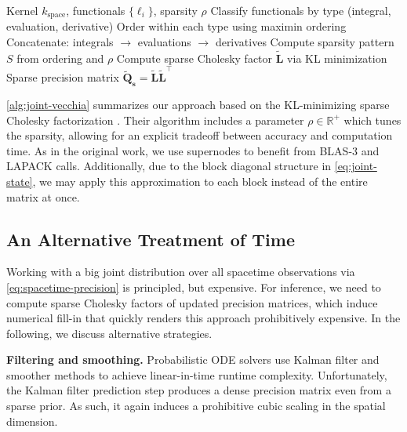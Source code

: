 \documentclass{article}
\theoremstyle{plain}
\theoremstyle{definition}
\theoremstyle{remark}
\newcommand{\R}{\mathbb{R}}
\begin{document}
\begin{algorithm}[tb]
  \caption{Joint Spatial Vecchia Approximation}
  \begin{algorithmic}
     Kernel $k_{\text{space}}$, functionals $\{\ell_i\}$, sparsity $\rho$
    \STATE Classify functionals by type (integral, evaluation, derivative)
    \STATE Order within each type using maximin ordering
    \STATE Concatenate: integrals $\rightarrow$ evaluations $\rightarrow$ derivatives
    \STATE Compute sparsity pattern $S$ from ordering and $\rho$
    \STATE Compute sparse Cholesky factor $\bm{\tilde{L}}$ via KL minimization
     Sparse precision matrix $\bm{\tilde{Q}_s} = \bm{\tilde{L}} \bm{\tilde{L}}^\top$
  \end{algorithmic}
  \label{alg:joint-vecchia}
\end{algorithm}

\cref{alg:joint-vecchia} summarizes our approach based on the KL-minimizing sparse Cholesky factorization \citep{schaferSparseCholeskyFactorization2021a}.
Their algorithm includes a parameter $\rho \in \R^+$ which tunes the sparsity, allowing for an explicit tradeoff between accuracy and computation time.
As in the original work, we use supernodes to benefit from BLAS-3 and LAPACK calls.
Additionally, due to the block diagonal structure in \cref{eq:joint-state}, we may apply this approximation to each block instead of the entire matrix at once.


\subsection{An Alternative Treatment of Time}
\label{sec:time}

Working with a big joint distribution over all spacetime observations via \cref{eq:spacetime-precision} is principled, but expensive.
For inference, we need to compute sparse Cholesky factors of updated precision matrices, which induce numerical fill-in that quickly renders this approach prohibitively expensive.
In the following, we discuss alternative strategies.

\textbf{Filtering and smoothing.}
Probabilistic ODE solvers \citep{tronarpProbabilisticSolutionsOrdinary2019b} use Kalman filter and smoother methods to achieve linear-in-time runtime complexity.
Unfortunately, the Kalman filter prediction step produces a dense precision matrix even from a sparse prior.
As such, it again induces a prohibitive cubic scaling in the spatial dimension.
\end{document}
